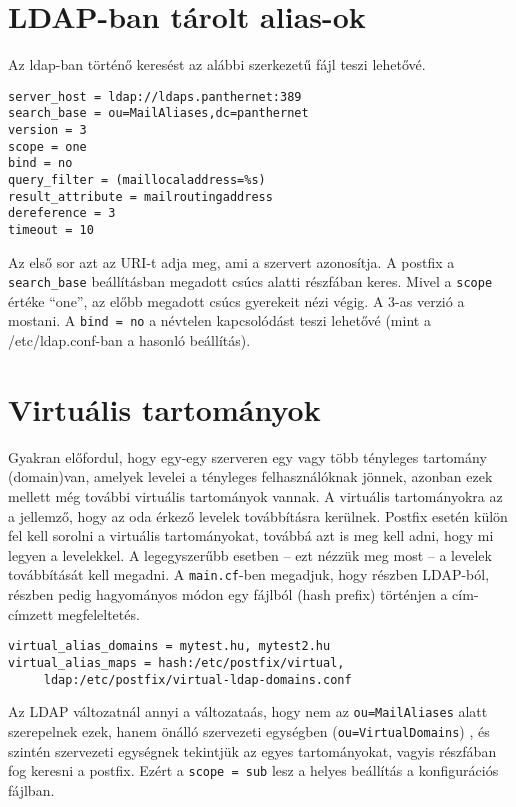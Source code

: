 \section{LDAP-ban tárolt alias-ok}
Az ldap-ban történő keresést az alábbi szerkezetű fájl teszi lehetővé.


\begin{Verbatim}[frame=single,label=/etc/postfix/ldapaliases.cf]
server_host = ldap://ldaps.panthernet:389
search_base = ou=MailAliases,dc=panthernet
version = 3
scope = one
bind = no
query_filter = (maillocaladdress=%s)
result_attribute = mailroutingaddress
dereference = 3
timeout = 10
\end{Verbatim}
Az első sor azt az URI-t adja meg, ami a szervert azonosítja. A postfix a \texttt{search\_base} beállításban megadott
csúcs alatti részfában keres. Mivel a \texttt{scope} értéke ``one'', az előbb megadott csúcs gyerekeit nézi végig. A
3-as verzió  a mostani. A \texttt{bind = no} a névtelen kapcsolódást teszi lehetővé (mint a /etc/ldap.conf-ban a
hasonló beállítás).

\section{Virtuális tartományok}
Gyakran előfordul, hogy egy-egy szerveren egy vagy több tényleges tartomány (domain)van, amelyek levelei a tényleges
felhasználóknak jönnek, azonban ezek mellett még további virtuális tartományok vannak. A virtuális tartományokra az a
jellemző, hogy az oda érkező levelek továbbításra kerülnek. Postfix esetén külön fel kell sorolni a virtuális
tartományokat, továbbá azt is meg kell adni, hogy mi legyen a levelekkel. A legegyszerűbb esetben -- ezt nézzük meg most
-- a levelek továbbítását kell megadni. A \texttt{main.cf}-ben megadjuk, hogy részben LDAP-ból, részben pedig
hagyományos módon egy fájlból (hash prefix) történjen a cím-címzett megfeleltetés.

\begin{Verbatim}[frame=single,label=main.cf részlet]
virtual_alias_domains = mytest.hu, mytest2.hu
virtual_alias_maps = hash:/etc/postfix/virtual,
     ldap:/etc/postfix/virtual-ldap-domains.conf
\end{Verbatim}

Az LDAP változatnál annyi a változataás, hogy nem az \texttt{ou=MailAliases} alatt szerepelnek ezek, hanem önálló
szervezeti egységben (\texttt{ou=VirtualDomains}) , és szintén szervezeti egységnek tekintjük az egyes tartományokat,
vagyis részfában fog keresni a postfix. Ezért a \texttt{scope = sub} lesz a helyes beállítás a konfigurációs fájlban.

